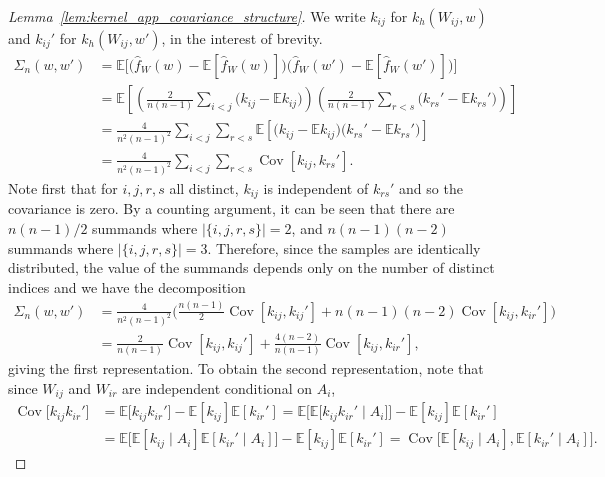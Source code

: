 \documentclass[11pt,lof]{puthesis}
\newcommand{\E}{\ensuremath{\mathbb{E}}}
\DeclareMathOperator{\Cov}{Cov}
\theoremstyle{break}
\theoremstyle{proof}
\newtheorem{proof}{Proof}
\begin{document}
\begin{proof}[Lemma~\ref{lem:kernel_app_covariance_structure}]

  We write $k_{i j}$ for $k_h(W_{i j},w)$
  and $k_{i j}'$ for $k_h(W_{i j},w')$, in the interest of brevity.
  \begin{align*}
    \Sigma_n(w,w')
    &=
    \E\Big[
      \big(
        \hat f_W(w)
        - \E[\hat f_W(w)]
      \big)
      \big(
        \hat f_W(w')
        - \E[\hat f_W(w')]
      \big)
    \Big] \\
    &=
    \E\left[
      \left(
        \frac{2}{n(n-1)}
        \sum_{i<j}
        \big(
          k_{i j} - \E k_{i j}
        \big)
      \right)
      \left(
        \frac{2}{n(n-1)}
        \sum_{r<s}
        \big(
          k_{rs}' - \E k_{rs}'
        \big)
      \right)
    \right] \\
    &=
    \frac{4}{n^2(n-1)^2}
    \sum_{i<j}
    \sum_{r<s}
    \E\left[
      \big(
        k_{i j} - \E k_{i j}
      \big)
      \big(
        k_{rs}' - \E k_{rs}'
      \big)
    \right] \\
    &=
    \frac{4}{n^2(n-1)^2}
    \sum_{i<j}
    \sum_{r<s}
    \Cov\left[
      k_{i j},
      k_{rs}'
    \right].
  \end{align*}
  Note first that
  for $i,j,r,s$ all distinct,
  $k_{i j}$ is independent of $k_{rs}'$
  and so the covariance is zero.
  By a counting argument,
  it can be seen that
  there are
  $n(n-1)/2$
  summands where
  $|\{i,j,r,s\}| = 2$,
  and $n(n-1)(n-2)$ summands where $|\{i,j,r,s\}| = 3$.
  Therefore, since the samples
  are identically distributed,
  the value of the summands
  depends only on the number of distinct indices
  and we have the decomposition
  \begin{align*}
    \Sigma_n(w,w')
    &=
    \frac{4}{n^2(n-1)^2}
    \bigg(
      \frac{n(n-1)}{2}
      \Cov[k_{i j}, k_{i j}']
      + n(n-1)(n-2)
      \Cov[k_{i j}, k_{i r}']
    \bigg) \\
    &=
    \frac{2}{n(n-1)}
    \Cov[k_{i j}, k_{i j}']
    + \frac{4(n-2)}{n(n-1)}
    \Cov[k_{i j}, k_{i r}'],
  \end{align*}
  giving the first representation.
  To obtain the second representation,
  note that since
  $W_{i j}$ and $W_{i r}$
  are independent conditional
  on $A_i$,
  \begin{align*}
    \Cov\big[
      k_{i j}
      k_{i r}'
    \big]
    &=
    \E\big[
      k_{i j}
      k_{i r}'
    \big]
    -
    \E[k_{i j}]
    \E[k_{i r}']
    =
    \E\big[
      \E\big[
        k_{i j}
        k_{i r}'
        \mid A_i
      \big]
    \big]
    -
    \E[k_{i j}]
    \E[k_{i r}'] \\
    &=
    \E\big[
      \E[k_{i j} \mid A_i]
      \E[k_{i r}' \mid A_i]
    \big]
    -
    \E[k_{i j}]
    \E[k_{i r}']
    =
    \Cov\big[
      \E[k_{i j} \mid A_i],
      \E[k_{i r}' \mid A_i]
    \big].
  \end{align*}
\end{proof}
\end{document}
